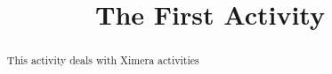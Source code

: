 \documentclass{ximera}
\title{The First Activity}
\begin{document}
  
\begin{abstract}  
This activity deals with Ximera activities 
\end{abstract}  
\maketitle  
\end{document}

